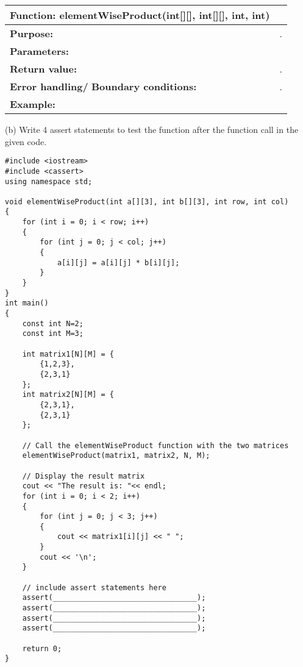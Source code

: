 \begin{longtable}[H]{|p{1.7in}|p{4.0in}|} \hline
        \textbf{Function:} \newline 
        elementWiseProduct(int[][], int[][], int, int) & 
        \\ \hline
        \textbf{Purpose:}  &.\\ \hline
        \textbf{Parameters:} &  
\\ \hline
        \textbf{Return value:} &  .\\ \hline
        \textbf{Error handling/} \newline
        \textbf{Boundary conditions:} & . \\ \hline 
        \textbf{Example:} & 
        \begin{example}

        \end{example}

        \begin{sample}

        \end{sample}
             \\ \hline
\end{longtable}

(b) Write 4 assert statements to test the function after the function call in the given code.

    \begin{verbatim}
#include <iostream>
#include <cassert>
using namespace std;

void elementWiseProduct(int a[][3], int b[][3], int row, int col)
{
    for (int i = 0; i < row; i++) 
    {
        for (int j = 0; j < col; j++) 
        {
            a[i][j] = a[i][j] * b[i][j];
        }
    }
}
int main() 
{
    const int N=2;
    const int M=3;

    int matrix1[N][M] = {
        {1,2,3},
        {2,3,1}
    };
    int matrix2[N][M] = {
        {2,3,1},
        {2,3,1}
    };

    // Call the elementWiseProduct function with the two matrices
    elementWiseProduct(matrix1, matrix2, N, M);

    // Display the result matrix
    cout << "The result is: "<< endl;
    for (int i = 0; i < 2; i++) 
    {
        for (int j = 0; j < 3; j++) 
        {
            cout << matrix1[i][j] << " ";
        }
        cout << '\n';
    }

    // include assert statements here
    assert(_________________________________);
    assert(_________________________________);
    assert(_________________________________);
    assert(_________________________________);

    return 0;
}

    \end{verbatim}

